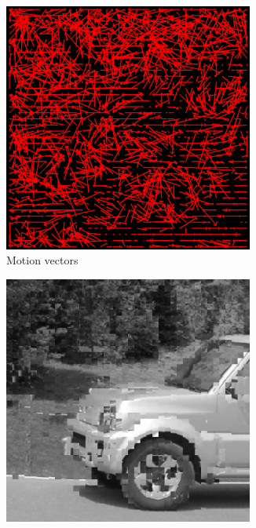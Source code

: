 \documentclass{homework}
\begin{document}
\begin{figure}[H]
    \centering
    \begin{subfigure}{0.32\textwidth}
        \centering
        \includegraphics[width=0.9\textwidth]{8_16_TSS_motion_vectors.png}
        \caption{Motion vectors}
    \end{subfigure}
    \begin{subfigure}{0.32\textwidth}
        \centering
        \includegraphics[width=0.9\textwidth]{8_16_TSS_motion_compensation.png}

\end{subfigure}
\end{figure}
\end{document}
